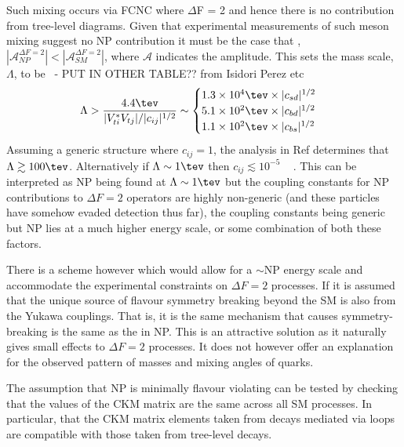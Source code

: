 Such mixing occurs via FCNC where $\Delta$F = 2 and hence there is no contribution from tree-level diagrams. %
Given that experimental measurements of such meson mixing suggest no NP contribution it must be the case that , $|\mathcal{A}_{NP}^{\Delta F = 2}|<|\mathcal{A}_{SM}^{\Delta F = 2}|$, where $\mathcal{A}$ indicates the amplitude. This  sets the mass scale, $\Lambda$, to be~\cite{kaonmix} - PUT IN OTHER TABLE?? from Isidori Perez etc
\begin{equation}
  \Lambda>\frac{4.4\tev}{|V_{ti}^{*}V_{tj}|/|c_{ij}|^{1/2}} \sim
  \begin{cases}
    1.3\times 10^{4}\tev \times |c_{sd}|^{1/2}\\
    5.1\times 10^{2}\tev \times |c_{bd}|^{1/2}\\
    1.1\times 10^{2}\tev \times |c_{bs}|^{1/2}\\
  \end{cases}
\end{equation}
Assuming a generic structure where $c_{ij} = 1$, the analysis in Ref determines that $\Lambda \gtrsim 100\tev$. Alternatively if $\Lambda \sim 1\tev$ then $c_{ij}\lesssim 10^{-5}$ ~\cite{flavourlimit} . This can be interpreted as NP being found at $\Lambda \sim 1\tev$  but the coupling constants for NP contributions to $\Delta F=2$ operators are highly non-generic (and these particles have somehow evaded detection thus far), the coupling constants being generic but NP lies at a much higher energy scale, or some combination of both these factors.

There is a scheme however which would allow for a $\sim$\tev NP energy scale and accommodate the experimental constraints on $\Delta F = 2$ processes. If it is assumed that the unique source of flavour symmetry breaking beyond the SM is also from the Yukawa couplings. That is, it is the same mechanism that causes symmetry-breaking is the same as the in NP. This is an attractive solution as it naturally gives small effects to $\Delta F = 2$ processes. It does not however offer an explanation for the observed pattern of masses and mixing angles of quarks.

The assumption that NP is minimally flavour violating can be tested by checking that the values of the CKM matrix are the same across all SM processes. In particular, that the CKM matrix elements taken from decays mediated via loops are compatible with those taken from tree-level decays.
